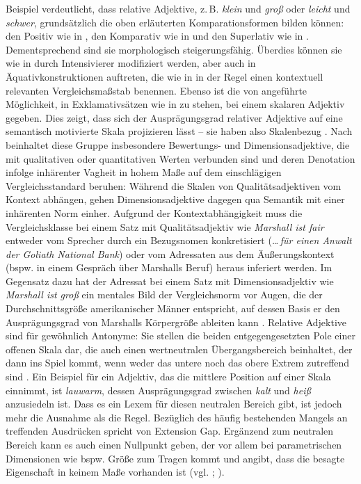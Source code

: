  \largerpage
\noindent Beispiel  verdeutlicht, dass relative Adjektive, z.\,B. \textit{klein} und \textit{groß} oder \textit{leicht} und \textit{schwer},
grundsätzlich die oben erläuterten Komparationsformen bilden können: den Positiv wie in , den Komparativ wie in  und den Superlativ wie in . Dementsprechend sind sie morphologisch steigerungsfähig. Überdies können sie wie in  durch Intensivierer modifiziert werden, aber auch in Äquativkonstruktionen auftreten, die wie {in } in der Regel einen kontextuell relevanten Vergleichsmaßstab benennen. Ebenso ist die von \citet[424]{Gnutzmann.1975} angeführte Möglichkeit, in Exklamativsätzen wie in  zu stehen, bei einem skalaren Adjektiv gegeben. Dies zeigt, dass sich der Ausprägungsgrad relativer Adjektive auf eine semantisch motivierte Skala projizieren lässt -- sie haben also Skalenbezug {\citep[vgl.][12ff.]{Kirschbaum.2002b}}. Nach \citet[11ff.]{Bierwisch.1987a} beinhaltet diese Gruppe insbesondere Bewertungs- und Dimensionsadjektive, die mit qualitativen oder quantitativen Werten verbunden sind und deren Denotation infolge inhärenter Vagheit in hohem Maße auf dem einschlägigen Vergleichsstandard beruhen: Während die Skalen von Qualitätsadjektiven vom Kontext abhängen, gehen Dimensionsadjektive dagegen qua Semantik mit einer inhärenten Norm einher. Aufgrund der Kontextabhängigkeit muss die Vergleichsklasse bei einem Satz mit Qualitätsadjektiv wie \textit{{Marshall} ist fair} entweder vom Sprecher durch ein Bezugsnomen konkretisiert (\textit{\dots\,für einen Anwalt der Goliath National Bank}) oder vom Adressaten aus dem Äußerungskontext (bspw. in einem Gespräch über Marshalls Beruf) heraus inferiert werden. Im Gegensatz dazu hat der Adressat bei einem Satz mit Dimensionsadjektiv wie \textit{Marshall ist groß} ein mentales Bild der Vergleichsnorm vor Augen, die der Durchschnittsgröße amerikanischer Männer entspricht, auf dessen Basis er den Ausprägungsgrad von Marshalls Körpergröße ableiten kann {\citep[vgl.][13]{Bierwisch.1987a}}. %
Relative Adjektive sind für gewöhnlich Antonyme: Sie stellen die beiden entgegengesetzten Pole einer offenen Skala dar, die auch einen wertneutralen Übergangsbereich beinhaltet, der dann ins Spiel kommt, wenn weder das untere noch das obere Extrem zutreffend sind {\citep[vgl.][237]{Loebner.2002}}. Ein Beispiel für ein Adjektiv, das die mittlere Position auf einer Skala einnimmt, ist \textit{lauwarm}, dessen Ausprägungsgrad zwischen \textit{kalt} und \textit{heiß} anzusiedeln ist. Dass es ein Lexem für diesen neutralen Bereich gibt, ist jedoch mehr die Ausnahme als die Regel. Bezüglich des häufig bestehenden Mangels an treffenden Ausdrücken spricht {\citet[10]{Klein.1980}} von \glqq{}Extension Gap\grqq{}. Ergänzend zum neutralen Bereich kann es auch einen Nullpunkt geben, der vor allem bei parametrischen Dimensionen wie bspw. Größe zum Tragen kommt und angibt, dass die besagte Eigenschaft in keinem Maße vorhanden ist (vgl. \citealt[57f.]{Os.1989}; {\citealt[237]{Loebner.2002}}).

